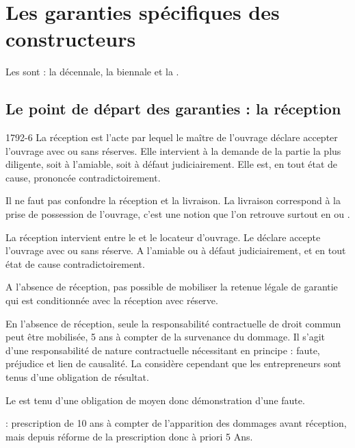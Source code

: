 
\chapter{Les garanties spécifiques des constructeurs}

Les \garSpec sont : la décennale, la biennale et la \gpa.

\section{Le point de départ des garanties : la réception}

	\label{Reception@Réception}\begin{citationArticleCciv}{1792-6}
		La réception est l'acte par lequel le maître de l'ouvrage déclare accepter l'ouvrage avec ou sans réserves. Elle intervient à la demande de la partie la plus diligente, soit à l'amiable, soit à défaut judiciairement. Elle est, en tout état de cause, prononcée contradictoirement.

		\lips
	\end{citationArticleCciv}

	Il ne faut pas confondre la réception et la livraison. La livraison correspond à la prise de possession de l'ouvrage, c'est une notion que l'on retrouve surtout en \VEFA ou \aCompleter.

	La réception intervient entre le \Mo et le locateur d’ouvrage. Le \Mo déclare accepte l’ouvrage avec ou sans réserve. A l’amiable ou à défaut judiciairement, et en tout état de cause contradictoirement.

	A l’absence de réception, pas possible de mobiliser la retenue légale de garantie qui est conditionnée avec la réception avec réserve.


	En l’absence de réception, seule la responsabilité contractuelle de droit commun peut être mobilisée, 5 ans à compter de la survenance du dommage. Il s'agit d'une responsabilité de nature contractuelle nécessitant en principe : faute, préjudice et lien de causalité. La \CourDeCas considère cependant que les entrepreneurs sont tenus d’une obligation de résultat.


	Le \Moe est tenu d’une obligation de moyen donc démonstration d’une faute.


	 : prescription de 10 ans à compter de l’apparition des dommages avant réception, mais depuis réforme de la prescription donc à priori 5 Ans.


